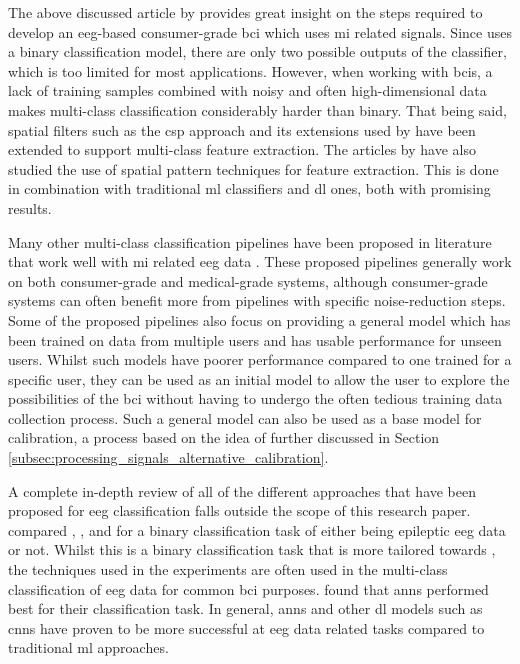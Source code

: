 The above discussed article by \citet{cheap_bci_feasibility} provides great insight on the steps required to develop an \gls{eeg}-based consumer-grade \gls{bci} which uses \gls{mi} related signals.
Since \citet{cheap_bci_feasibility} uses a binary classification model, there are only two possible outputs of the classifier, which is too limited for most applications.
However, when working with \glspl{bci}, a lack of training samples combined with noisy and often high-dimensional data makes multi-class classification considerably harder than binary.
That being said, spatial filters such as the \gls{csp} approach and its extensions used by \citet{cheap_bci_feasibility} have been extended to support multi-class feature extraction.
The articles by \citet{eeg_mi_model_lda_csp, eeg_mi_model_deep_cnn_spatial_filters} have also studied the use of spatial pattern techniques for feature extraction.
This is done in combination with traditional \gls{ml} classifiers and \gls{dl} ones, both with promising results.

Many other multi-class classification pipelines have been proposed in literature that work well with \gls{mi} related \gls{eeg} data \citep{fbcnet, eeg_mi_model_mussi, eeg_mi_model_lda_csp, eeg_mi_model_deep_cnn_spatial_filters, eeg_mi_model_image_based, eeg_model_fbcsp, eeg_model_hbm, eeg_model_esi, eeg_model_eegnet}.
These proposed pipelines generally work on both consumer-grade and medical-grade systems, although consumer-grade systems can often benefit more from pipelines with specific noise-reduction steps.
Some of the proposed pipelines also focus on providing a general model which has been trained on data from multiple users and has usable performance for unseen users.
Whilst such models have poorer performance compared to one trained for a specific user, they can be used as an initial model to allow the user to explore the possibilities of the \gls{bci} without having to undergo the often tedious training data collection process.
Such a general model can also be used as a base model for calibration, a process based on the idea of  further discussed in Section \ref{subsec:processing_signals_alternative_calibration}.


A complete in-depth review of all of the different approaches that have been proposed for \gls{eeg} classification falls outside the scope of this research paper.
 compared , ,  and  for a binary classification task of either being epileptic \gls{eeg} data or not.
Whilst this is a binary classification task that is more tailored towards , the techniques used in the experiments are often used in the multi-class classification of \gls{eeg} data for common \gls{bci} purposes.
 found that \glspl{ann} performed best for their classification task.
In general, \glspl{ann} and other \gls{dl} models such as \glspl{cnn} have proven to be more successful at \gls{eeg} data related tasks compared to traditional \gls{ml} approaches.

